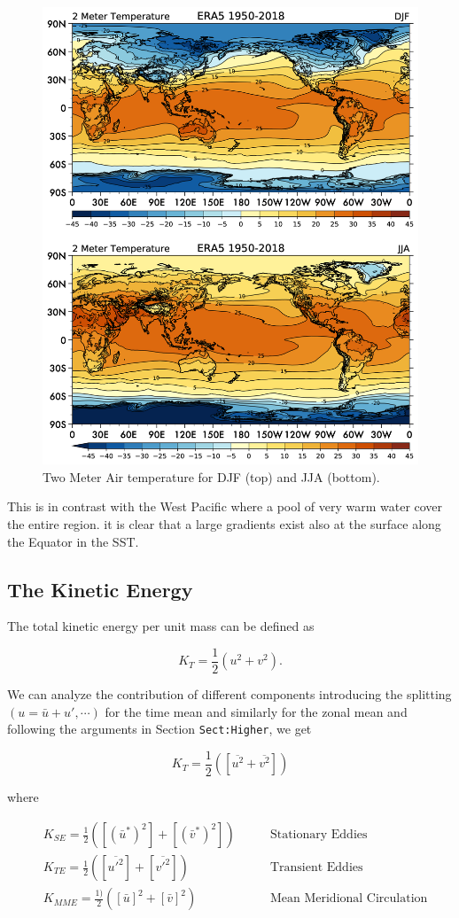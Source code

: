 \begin{figure}
\centering
\includegraphics[width = .7 \textwidth]{figs/GD/2T.png}
\caption{Two Meter Air temperature for DJF (top) and JJA (bottom).}
\label{fig:}
\end{figure}

This is in contrast with the West Pacific where a pool of very warm
water cover the entire region. it is clear that a large gradients exist
also at the surface along the Equator in the SST.

\subsection{The Kinetic Energy}\label{the-kinetic-energy}

The total kinetic energy per unit mass can be defined as

\[K_T = \frac{1} {2} ( u^2 + v^2).\]

We can analyze the contribution of different components introducing the
splitting \((u = \bar{u}+ u', \cdots )\) for the time mean and similarly
for the zonal mean and following the arguments in Section
\texttt{Sect:Higher}, we get

\[K_T = \frac{1} {2}( [\overline{u^2} + \overline{v^2}])\]

where

\[\begin{aligned}
&K_{SE} =\frac{1} {2}( [(\bar{u}^*)^2]  + [(\bar{v}^*)^2]) \qquad & \text{Stationary Eddies}\\
& K_{TE} = \frac{1} {2}( [\overline{u'^2}]  +[\overline{v'^2}] ) \qquad & \text{Transient Eddies}\\
& K_{MME} = \frac{1)} {2}([\bar{u}]^2 + [\bar{v}]^2) \qquad & \text{Mean Meridional Circulation}
\end{aligned}\]

